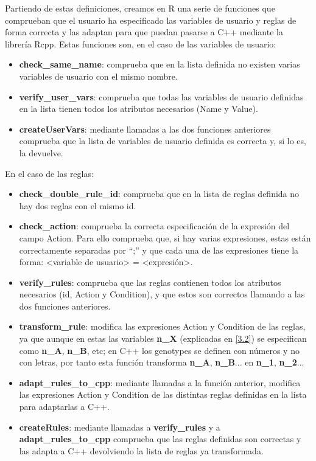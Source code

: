 Partiendo de estas definiciones, creamos en R una serie de funciones que comprueban que el usuario ha especificado las variables de usuario y reglas de forma correcta y las adaptan para que puedan pasarse a C++ mediante la librería Rcpp\cite{Rcpp}. Estas funciones son, en el caso de las variables de usuario:

\begin{itemize}
	\item \textbf{check\_same\_name}: comprueba que en la lista definida no existen varias variables de usuario con el mismo nombre.
	\item \textbf{verify\_user\_vars}: comprueba que todas las variables de usuario definidas en la lista tienen todos los atributos necesarios (Name y Value).
	\item \textbf{createUserVars}: mediante llamadas a las dos funciones anteriores comprueba que la lista de variables de usuario definida es correcta y, si lo es, la devuelve.
\end{itemize}

En el caso de las reglas:

\begin{itemize}
	\item \textbf{check\_double\_rule\_id}: comprueba que en la lista de reglas definida no hay dos reglas con el mismo id.
	\item \textbf{check\_action}: comprueba la correcta especificación de la expresión del campo Action. Para ello comprueba que, si hay varias expresiones, estas están correctamente separadas por ``;'' y que cada una de las expresiones tiene la forma: <variable de usuario> = <expresión>.
	\item \textbf{verify\_rules}: comprueba que las reglas contienen todos los atributos necesarios (id, Action y Condition), y que estos son correctos llamando a las dos funciones anteriores. 
	\item \textbf{transform\_rule}: modifica las expresiones Action y Condition de las reglas, ya que aunque en estas las variables \textbf{n\_X} (explicadas en \ref{3.2}) se especifican como \textbf{n\_A}, \textbf{n\_B}, etc; en C++ los \glspl{genotype} se definen con números y no con letras, por tanto esta función transforma \textbf{n\_A}, \textbf{n\_B}... en \textbf{n\_1}, \textbf{n\_2}... 
	\item \textbf{adapt\_rules\_to\_cpp}: mediante llamadas a la función anterior, modifica las expresiones Action y Condition de las distintas reglas definidas en la lista para adaptarlas a C++.
	\item \textbf{createRules}: mediante llamadas a \textbf{verify\_rules} y a \textbf{adapt\_rules\_to\_cpp} comprueba que las reglas definidas son correctas y las adapta a C++ devolviendo la lista de reglas ya transformada.
\end{itemize}

